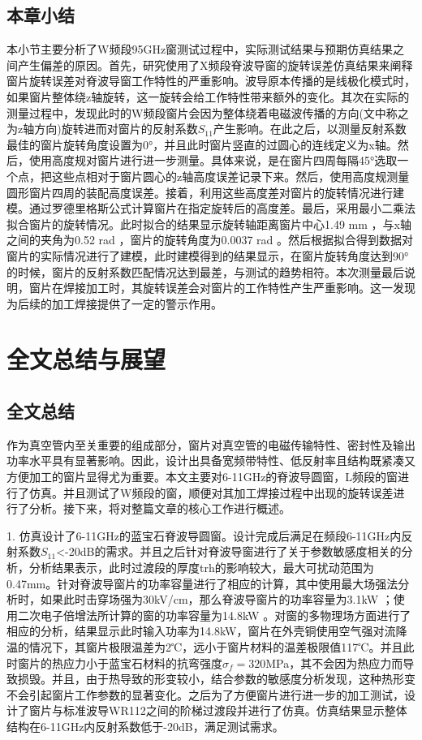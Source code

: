 \documentclass[master]{thesis-uestc}
\begin{document}
\section{本章小结}
本小节主要分析了W频段95GHz窗测试过程中，实际测试结果与预期仿真结果之间产生偏差的原因。首先，研究使用了X频段脊波导窗的旋转误差仿真结果来阐释窗片旋转误差对脊波导窗工作特性的严重影响。波导原本传播的是线极化模式时，如果窗片整体绕z轴旋转，这一旋转会给工作特性带来额外的变化。其次在实际的测量过程中，发现此时的W频段窗片会因为整体绕着电磁波传播的方向(文中称之为z轴方向)旋转进而对窗片的反射系数\(S_{11}\)产生影响。在此之后，以测量反射系数最佳的窗片旋转角度设置为0°，并且此时窗片竖直的过圆心的连线定义为x轴。然后，使用高度规对窗片进行进一步测量。具体来说，是在窗片四周每隔45°选取一个点，把这些点相对于窗片圆心的z轴高度误差记录下来。然后，使用高度规测量圆形窗片四周的装配高度误差。接着，利用这些高度差对窗片的旋转情况进行建模。通过罗德里格斯公式计算窗片在指定旋转后的高度差。最后，采用最小二乘法拟合窗片的旋转情况。此时拟合的结果显示旋转轴距离窗片中心1.49 mm ，与x轴之间的夹角为0.52 rad ，窗片的旋转角度为0.0037 rad 。然后根据拟合得到数据对窗片的实际情况进行了建模，此时建模得到的结果显示，在窗片旋转角度达到90°的时候，窗片的反射系数匹配情况达到最差，与测试的趋势相符。本次测量最后说明，窗片在焊接加工时，其旋转误差会对窗片的工作特性产生严重影响。这一发现为后续的加工焊接提供了一定的警示作用。

\chapter{全文总结与展望}

\section{全文总结}
作为真空管内至关重要的组成部分，窗片对真空管的电磁传输特性、密封性及输出功率水平具有显著影响。因此，设计出具备宽频带特性、低反射率且结构既紧凑又方便加工的窗片显得尤为重要。本文主要对6-11GHz的脊波导圆窗，L频段的窗进行了仿真。并且测试了W频段的窗，顺便对其加工焊接过程中出现的旋转误差进行了分析。接下来，将对整篇文章的核心工作进行概述。

1. 仿真设计了6-11GHz的蓝宝石脊波导圆窗。设计完成后满足在频段6-11GHz内反射系数\(S_{11}\)<-20dB的需求。并且之后针对脊波导窗进行了关于参数敏感度相关的分析，分析结果表示，此时过渡段的厚度trh的影响较大，最大可扰动范围为0.47mm。针对脊波导窗片的功率容量进行了相应的计算，其中使用最大场强法分析时，如果此时击穿场强为30kV/cm，那么脊波导窗片的功率容量为3.1kW ；使用二次电子倍增法所计算的窗的功率容量为14.8kW 。对窗的多物理场方面进行了相应的分析，结果显示此时输入功率为14.8kW，窗片在外壳铜使用空气强对流降温的情况下，其窗片极限温差为2℃，远小于窗片材料的温差极限值117℃。并且此时窗片的热应力小于蓝宝石材料的抗弯强度\(\sigma_f = 320\)MPa，其不会因为热应力而导致损毁。并且，由于热导致的形变较小，结合参数的敏感度分析发现，这种热形变不会引起窗片工作参数的显著变化。之后为了方便窗片进行进一步的加工测试，设计了窗片与标准波导WR112之间的阶梯过渡段并进行了仿真。仿真结果显示整体结构在6-11GHz内反射系数低于-20dB，满足测试需求。
\end{document}
